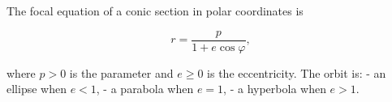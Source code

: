The focal equation of a conic section in polar coordinates is

$$r = \frac{p}{1 + e \cos \varphi},$$

where $p > 0$ is the parameter and $e \geq 0$ is the eccentricity. The orbit is:
- an ellipse when $e < 1$,
- a parabola when $e = 1$,
- a hyperbola when $e > 1$.
